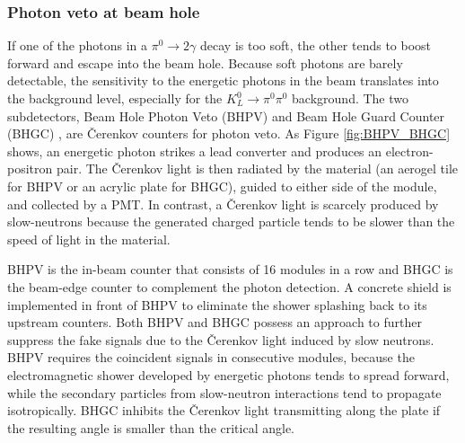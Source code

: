 
\subsubsection{Photon veto at beam hole}
If one of the photons in a $\pi^0\to2\gamma$ decay is too soft, the other tends to boost forward and escape into the beam hole. Because soft photons are barely detectable, the sensitivity to the energetic photons in the beam translates into the background level, especially for the ${K_L^0 \to \pi^0 \pi^0}$ background. The two subdetectors, Beam Hole Photon Veto (BHPV) \parencite{BHPV} and Beam Hole Guard Counter (BHGC) \parencite{BHGC}, are \v{C}erenkov counters for photon veto. As Figure \ref{fig:BHPV_BHGC} shows, an energetic photon strikes a lead converter and produces an electron-positron pair. The \v{C}erenkov light is then radiated by the material (an aerogel tile for BHPV or an acrylic plate for BHGC), guided to either side of the module, and collected by a PMT.  In contrast, a \v{C}erenkov light is scarcely produced by slow-neutrons because the generated charged particle tends to be slower than the speed of light in the material.

BHPV is the in-beam counter that consists of 16 modules in a row and BHGC is the beam-edge counter to complement the photon detection. A concrete shield is implemented in front of BHPV to eliminate the shower splashing back to its upstream counters. Both BHPV and BHGC possess an approach to further suppress the fake signals due to the \v{C}erenkov light induced by slow neutrons. BHPV requires the coincident signals in consecutive modules, because the electromagnetic shower developed by energetic photons tends to spread forward, while the secondary particles from slow-neutron interactions tend to propagate isotropically. BHGC inhibits the \v{C}erenkov light transmitting along the plate if the resulting angle is smaller than the critical angle.


